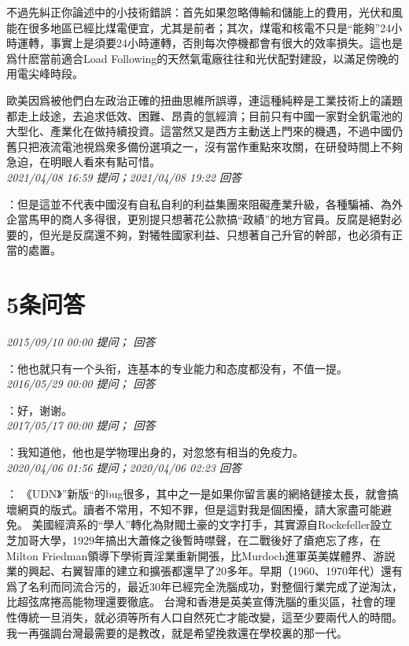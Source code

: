 \documentclass[twocolumn]{ctexart}
\begin{document}
不過先糾正你論述中的小技術錯誤：首先如果忽略傳輸和儲能上的費用，光伏和風能在很多地區已經比煤電便宜，尤其是前者；其次，煤電和核電不只是“能夠”24小時運轉，事實上是須要24小時運轉，否則每次停機都會有很大的效率損失。這也是爲什麽當前適合Load Following的天然氣電廠往往和光伏配對建設，以滿足傍晚的用電尖峰時段。

歐美因爲被他們白左政治正確的扭曲思維所誤導，連這種純粹是工業技術上的議題都走上歧途，去追求低效、困難、昂貴的氫經濟；目前只有中國一家對全釩電池的大型化、產業化在做持續投資。這當然又是西方主動送上門來的機遇，不過中國仍舊只把液流電池視爲衆多備份選項之一，沒有當作重點來攻關，在研發時間上不夠急迫，在明眼人看來有點可惜。
\\

\textit{\hfill\noindent\small 2021/04/08 16:59 提问；2021/04/08 19:22 回答}

：但是這並不代表中國沒有自私自利的利益集團來阻礙產業升級，各種騙補、為外企當馬甲的商人多得很，更別提只想著花公款搞“政績”的地方官員。反腐是絕對必要的，但光是反腐還不夠，對犧牲國家利益、只想著自己升官的幹部，也必須有正當的處置。
\\

\section{5条问答}

\textit{\hfill\noindent\small 2015/09/10 00:00 提问； 回答}

：他也就只有一个头衔，连基本的专业能力和态度都没有，不值一提。\\

\textit{\hfill\noindent\small 2016/05/29 00:00 提问； 回答}

：好，谢谢。\\

\textit{\hfill\noindent\small 2017/05/17 00:00 提问； 回答}

：我知道他，他也是学物理出身的，对忽悠有相当的免疫力。\\

\textit{\hfill\noindent\small 2020/04/06 01:56 提问；2020/04/06 02:23 回答}

：
《UDN》”新版“的bug很多，其中之一是如果你留言裏的網絡鏈接太長，就會搞壞網頁的版式。讀者不常用，不知不罪，但是這對我是個困擾，請大家盡可能避免。 
美國經濟系的“學人”轉化為財閥土豪的文字打手，其實源自Rockefeller設立芝加哥大學，1929年搞出大蕭條之後暫時噤聲，在二戰後好了瘡疤忘了疼，在Milton Friedman領導下學術賣淫業重新開張，比Murdoch進軍英美媒體界、游説業的興起、右翼智庫的建立和擴張都還早了20多年。早期（1960、1970年代）還有爲了名利而同流合污的，最近30年已經完全洗腦成功，對整個行業完成了逆淘汰，比超弦席捲高能物理還要徹底。 
台灣和香港是英美宣傳洗腦的重災區，社會的理性傳統一旦消失，就必須等所有人口自然死亡才能改變，這至少要兩代人的時間。我一再强調台灣最需要的是教改，就是希望挽救還在學校裏的那一代。
\\
\end{document}
